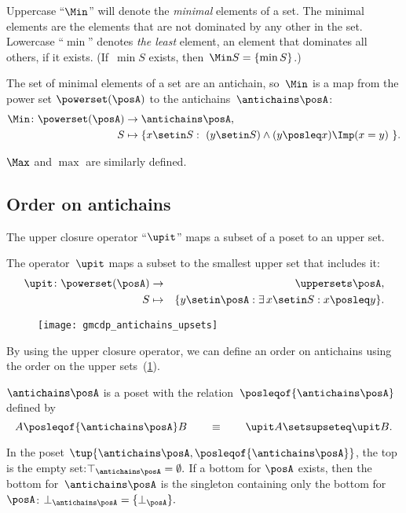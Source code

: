 
Uppercase ``$\Min$'' will denote the \emph{minimal} elements of a set.
The minimal elements are the elements that are not dominated by any other in the set.
Lowercase ``$\min$'' denotes\emph{ the least} element, an element that dominates all others, if it exists.
(If~$\min S$ exists, then~$\Min S=\{\min S\}$.)

The set of minimal elements of a set are an antichain, so~$\Min$
is a map from the power set $\powerset(\posA)$ to the antichains~$\antichains\posA$:
\begin{align*}
    \Min\colon\powerset(\posA) & \rightarrow\antichains\posA, \\
    S                          & \mapsto\{x\setin S:\ (y\setin S)\wedge(y\posleq x)\Imp(x=y)\ \}.
\end{align*}

$\Max$ and $\max$ are similarly defined.

\subsection{Order on antichains}

The upper closure operator ``$\upit$'' maps a subset of a poset to an upper set.
\begin{definition}
    The operator~$\upit$ maps a subset to the smallest upper set that includes it:
    \begin{eqnarray*}
        \upit\colon\powerset(\posA) & \rightarrow & \uppersets\posA,\\
        S & \mapsto & \{y\setin\posA:\exists\,x\setin S:x\posleq y\}.
    \end{eqnarray*}
\end{definition}

\begin{figure}[h]
    \centering
    \texttt{[image: gmcdp\_antichains\_upsets]}
    \caption{}
    \label{fig:antichains_upsets}
\end{figure}

By using the upper closure operator, we can define an order on antichains using the order on the upper sets~(\cref{fig:antichains_upsets}).
\begin{lemma}
    \label{lem:antichains-are-poset}$\antichains\posA$ is a poset with the relation~$\posleqof{\antichains\posA}$ defined by
    \[
        A\posleqof{\antichains\posA}
        B\qquad\equiv\qquad\upit A\setsupseteq\upit B.
    \]
\end{lemma}
In the poset $\tup{\antichains\posA,\posleqof{\antichains\posA}}$, the top is the empty set:$\top_{\antichains\posA}=\emptyset.
$ If a bottom for $\posA$ exists, then the bottom for~$\antichains\posA$
is the singleton containing only the bottom for~$\posA$: $\bot_{\antichains\posA}=\{\bot_{\posA}\}.$

